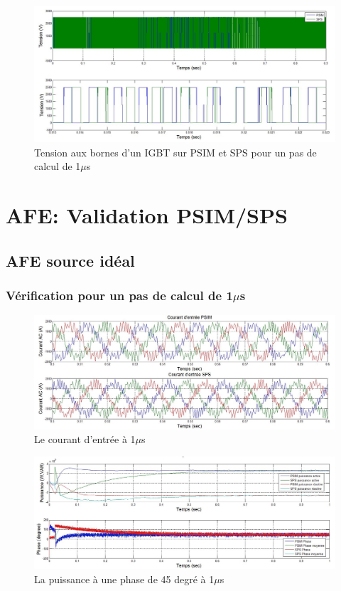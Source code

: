 \documentclass[11pt,letterpaper,final]{report}
\begin{document}
\begin{figure}[htb]
\centering
\includegraphics[scale=0.5]{Fig/DCPDCN/DCPTensionIGBT1u.jpg}
\caption{Tension aux bornes d'un IGBT sur PSIM et SPS pour un pas de calcul de 1$\mu$s}
\label{DC_IG_ten_1}
\end{figure}

\clearpage
\section{AFE: Validation PSIM/SPS}
\subsection{AFE source idéal}
\subsubsection{Vérification pour un pas de calcul de 1$\mu$s}

\begin{figure}[htb]
\centering
\includegraphics[scale=0.5]{Fig/AFEIDEAL/CourantAC.jpg}
\caption{Le courant d'entrée à 1$\mu$s}
\label{AF_I_cou}
\end{figure}

\begin{figure}[htb]
\centering
\includegraphics[scale=0.5]{Fig/AFEIDEAL/pui45.jpg}
\caption{La puissance à une phase de 45 degré à 1$\mu$s}
\label{AF_I_pui_45}
\end{figure}
\end{document}
